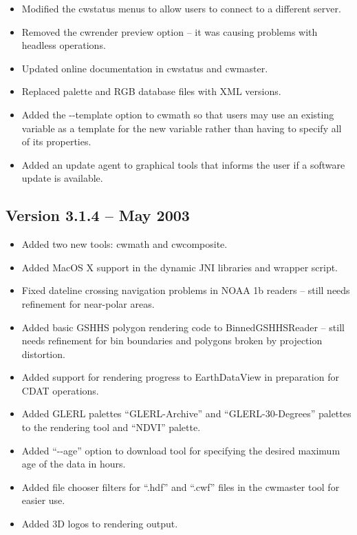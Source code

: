 \begin{itemize}
  \item Modified the cwstatus menus to allow users to connect to a
  different server.

  \item Removed the cwrender preview option -- it was causing problems
  with headless operations.

  \item Updated online documentation in cwstatus and cwmaster.

  \item Replaced palette and RGB database files with XML versions.

  \item Added the -{-}template option to cwmath so that users may use an
  existing variable as a template for the new variable rather than
  having to specify all of its properties.

  \item Added an update agent to graphical tools that informs the user
  if a software update is available.

\end{itemize}


\subsection*{Version 3.1.4 -- May 2003}

\begin{itemize}

  \item Added two new tools: cwmath and cwcomposite.

  \item Added MacOS X support in the dynamic JNI libraries and wrapper
  script.

  \item Fixed dateline crossing navigation problems in NOAA 1b readers
  -- still needs refinement for near-polar areas.

  \item Added basic GSHHS polygon rendering code to BinnedGSHHSReader
  -- still needs refinement for bin boundaries and polygons broken by
  projection distortion.

  \item Added support for rendering progress to EarthDataView in
  preparation for CDAT operations.

  \item Added GLERL palettes ``GLERL-Archive'' and
  ``GLERL-30-Degrees'' palettes to the rendering tool and ``NDVI''
  palette.

  \item Added ``-{-}age'' option to download tool for specifying the
  desired maximum age of the data in hours.

  \item Added file chooser filters for ``.hdf'' and ``.cwf'' files in
  the cwmaster tool for easier use.

  \item Added 3D logos to rendering output.

\end{itemize}

